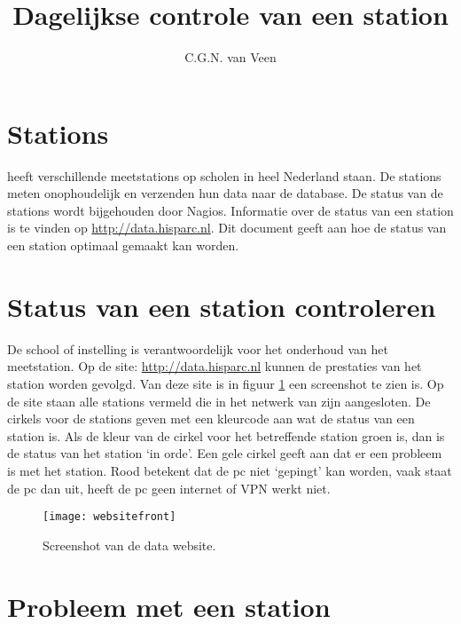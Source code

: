 



\title{Dagelijkse controle van een station} \author{C.G.N. van Veen}
\date{}

\maketitle

\section{Stations}

\hisparc heeft verschillende meetstations op scholen in heel Nederland
staan. De stations meten onophoudelijk en verzenden hun data naar de
\hisparc database. De status van de \hisparc stations wordt bijgehouden
door Nagios. Informatie over de status van een station is te vinden op
\url{http://data.hisparc.nl}. Dit document geeft aan hoe de status van
een station optimaal gemaakt kan worden.

\section{Status van een station controleren}

De school of instelling is verantwoordelijk voor het onderhoud van het
meetstation. Op de site: \url{http://data.hisparc.nl} kunnen de
prestaties van het station worden gevolgd. Van deze site is in figuur
\ref{fig:frontweb} een screenshot te zien is. Op de site staan alle
stations vermeld die in het netwerk van \hisparc zijn aangesloten. De
cirkels voor de stations geven met een kleurcode aan wat de status van
een station is. Als de kleur van de cirkel voor het betreffende station
groen is, dan is de status van het station `in orde'. Een gele cirkel
geeft aan dat er een probleem is met het station. Rood betekent dat de
pc niet `gepingt' kan worden, vaak staat de pc dan uit, heeft de pc geen
internet of VPN werkt niet.

\begin{figure}
    \centering \texttt{[image: websitefront]}
    \caption{Screenshot van de \hisparc data website.} 
    \label{fig:frontweb}
\end{figure}

\section{Probleem met een station}


